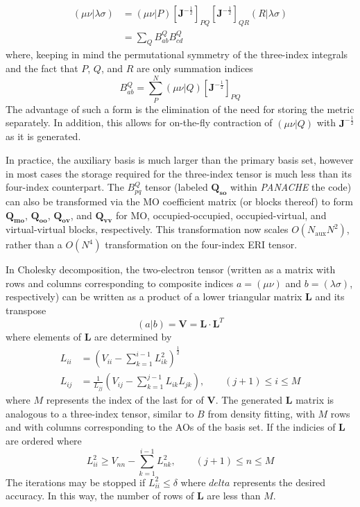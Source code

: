 \documentclass[12pt,letterpaper]{article}
\newcommand{\transpose}{T}
\newcommand{\mat}[1]{\ensuremath{\bm{#1}}\xspace}
\newcommand{\ten}[1]{\ensuremath{\bm{#1}}\xspace}
\newcommand{\panache}{\textit{PANACHE}\xspace}
\newcommand{\Qso}{\ten{Q_{so}}}
\newcommand{\Qmo}{\ten{Q_{mo}}}
\newcommand{\Qoo}{\ten{Q_{oo}}}
\newcommand{\Qov}{\ten{Q_{ov}}}
\newcommand{\Qvv}{\ten{Q_{vv}}}
\begin{document}
\begin{align}
( \mu\nu | \lambda\sigma ) &= (\mu\nu | P) [\mat{J}^{-\frac{1}{2}}]_{PQ} [\mat{J}^{-\frac{1}{2}}]_{QR} (R | \lambda\sigma) \\
              &= \sum_{Q}  B_{ab}^Q B_{cd}^Q
\label{eqn:df-simple}
\end{align}
%
where, keeping in mind the permutational symmetry of the three-index integrals
and the fact that $P$, $Q$, and $R$ are only summation indices
% 
\begin{equation}
B_{ab}^Q = \sum_P^N ( \mu\nu | Q ) [\mat{J}^{-\frac{1}{2}}]_{PQ} 
\label{eqn:df-simpleB}
\end{equation}
%
The advantage of such a form is the elimination of the need for storing the
metric separately. In addition, this allows for on-the-fly contraction
of $( \mu\nu | Q )$ with $\mat{J}^{-\frac{1}{2}}$ as it is generated.

In practice, the auxiliary basis is much larger than the primary basis
set, however in most cases the storage required for the three-index tensor
is much less than its four-index counterpart.  The $B_{pq}^Q$ tensor
(labeled \Qso within \panache the code) can also be transformed via the
MO coefficient matrix (or blocks thereof) to form \Qmo, \Qoo, \Qov, and
\Qvv for MO, occupied-occupied, occupied-virtual, and virtual-virtual
blocks, respectively. This transformation now scales $O(N_\mathrm{aux} N^2)$, rather
than a $O(N^4)$ transformation on the four-index ERI tensor.


In Cholesky decomposition,\cite{Roeggen:2008a,Beebe:1977a} the two-electron tensor (written as a matrix
with rows and columns corresponding to composite indices $a=(\mu\nu)$
and $b=(\lambda\sigma)$, respectively) can be written as a product of a lower
triangular matrix $\mat{L}$ and its transpose
%
\begin{equation}
(a | b) = \mat{V} = \mat{L}\cdot\mat{L}^{\transpose}
\end{equation}
%
where elements of $\mat{L}$ are determined by
%
\begin{align}
L_{ii} &= \left( V_{ii} - \sum_{k=1}^{i-1} L_{ik}^2 \right)^{\frac{1}{2}} \\
L_{ij} &= \frac{1}{L_{jj}} \left( V_{ij} - \sum_{k=1}^{j-1} L_{ik}L_{jk} \right), \qquad (j+1) \leq i \leq M
\end{align}
%
where $M$ represents the index of the last for of $\mat{V}$.
The generated $\mat{L}$ matrix is analogous to a three-index tensor,
similar to $B$ from density fitting, with $M$ rows and with columns corresponding
to the AOs of the basis set.
If the indicies of $\mat{L}$ are ordered where
%
\begin{equation}
L_{ii}^2 \geq V_{nn} - \sum_{k=1}^{i-1} L_{nk}^2, \qquad (j+1) \leq n \leq M
\end{equation}
%
The iterations may be stopped if $L_{ii}^2 \leq \delta$ where $delta$ represents
the desired accuracy. In this way, the number of rows of $\mat{L}$ are less than
$M$.
\end{document}
